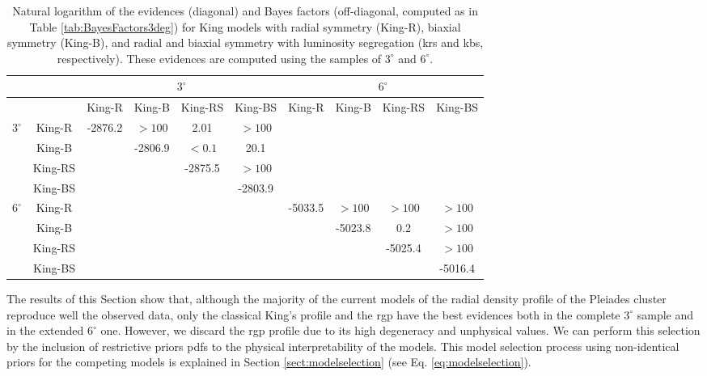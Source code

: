 \begin{table}[ht!]
  \centering
  \caption[]{Natural logarithm of the evidences (diagonal) and Bayes factors (off-diagonal, computed as in Table \ref{tab:BayesFactors3deg}) for King models with radial symmetry (King-R), biaxial symmetry (King-B), and radial and biaxial symmetry with luminosity segregation (\gls{krs} and \gls{kbs}, respectively). These evidences are computed using the samples of $3^{\circ}$ and $6^{\circ}$.}
  {\small 
\begin{tabular}{cc|cccc|cccc}
\hline              
\hline              
&&  \multicolumn{4}{c}{$3^{\circ}$} &   \multicolumn{4}{c}{$6^{\circ}$} \\
\hline              
&&King-R& King-B &  King-RS& King-BS & King-R & King-B& King-RS &  King-BS \\
\hline              
\multirow{4}{*}{$3^{\circ}$} &King-R&-2876.2&$>100$&2.01&$>100$&&&&\\
&King-B&&-2806.9&$<0.1$&20.1&&&&\\
&King-RS    & & &-2875.5   & $>100$&          &           &    &        \\
 &King-BS &    &   &     &  -2803.9  &   &&        &           \\
 \hline
\multirow{4}{*}{$6^{\circ}$}&King-R   && &&            & -5033.5          & $>100$  & $>100$&  $>100$  \\
&King-B&&&&&&-5023.8&0.2& $>100$\\
&King-RS &&&&            &           &         & -5025.4  &   $>100$  \\
&King-BS &&&&            &           &         &  &  -5016.4   \\
\hline              
         \end{tabular}
         }
\label{tab:BayesFactorsAll}
\end{table}

The results of this Section show that, although the majority of the current models of the radial density profile of the Pleiades cluster reproduce well the observed data, only the classical King's profile and the \gls{rgp} have the best evidences both in the complete $3^\circ$ sample and in the extended $6^\circ$ one. However, we discard the \gls{rgp} profile due to its high degeneracy and unphysical values. We can perform this selection by the inclusion of restrictive priors \glspl{pdf} to the physical interpretability of the models. This model selection process using non-identical priors for the competing models is explained in Section \ref{sect:modelselection} (see Eq. \ref{eq:modelselection}). 

